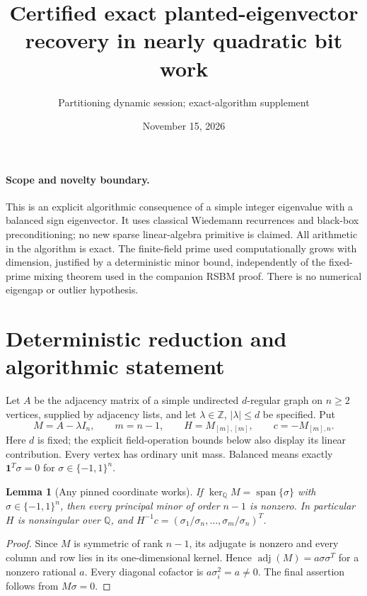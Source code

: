 \documentclass[11pt]{article}
\title{Certified exact planted-eigenvector recovery in nearly quadratic bit work}
\author{Partitioning dynamic session; exact-algorithm supplement}
\date{November 15, 2026}
\newtheorem{lemma}[theorem]{Lemma}
\newcommand{\one}{\boldsymbol 1}
\newcommand{\kerQ}{\ker_{\mathbb Q}}
\begin{document}
\maketitle

\paragraph{Scope and novelty boundary.}
This is an explicit algorithmic consequence of a simple integer
eigenvalue with a balanced sign eigenvector. It uses classical
Wiedemann recurrences and black-box preconditioning; no new sparse
linear-algebra primitive is claimed. All arithmetic in the algorithm
is exact. The finite-field prime used computationally grows with
dimension, justified by a deterministic minor bound, independently
of the fixed-prime mixing theorem used in the companion RSBM proof.
There is no numerical eigengap or outlier hypothesis.

\section{Deterministic reduction and algorithmic statement}
Let $A$ be the adjacency matrix of a simple undirected $d$-regular
graph on $n\ge2$ vertices, supplied by adjacency lists, and let
$\lambda\in\mathbb Z$, $|\lambda|\le d$ be specified. Put
\[
 M=A-\lambda I_n,\qquad m=n-1,\qquad
 H=M_{[m],[m]},\qquad c=-M_{[m],n}.
\]
Here $d$ is fixed; the explicit field-operation bounds below also
display its linear contribution. Every vertex has ordinary unit mass.
Balanced means exactly $\one^T\sigma=0$ for $\sigma\in\{-1,1\}^n$.

\begin{lemma}[Any pinned coordinate works]\label{lem:minor}
If $\kerQ M=\operatorname{span}\{\sigma\}$ with
$\sigma\in\{-1,1\}^n$, then every principal minor of order $n-1$
is nonzero. In particular $H$ is nonsingular over $\mathbb Q$,
and $H^{-1}c=(\sigma_1/\sigma_n,\ldots,\sigma_m/\sigma_n)^T$.
\end{lemma}
\begin{proof}
Since $M$ is symmetric of rank $n-1$, its adjugate is nonzero and
every column and row lies in its one-dimensional kernel. Hence
$\operatorname{adj}(M)=a\sigma\sigma^T$ for a nonzero rational $a$.
Every diagonal cofactor is $a\sigma_i^2=a\ne0$.
The final assertion follows from $M\sigma=0$.
\end{proof}
\end{document}
